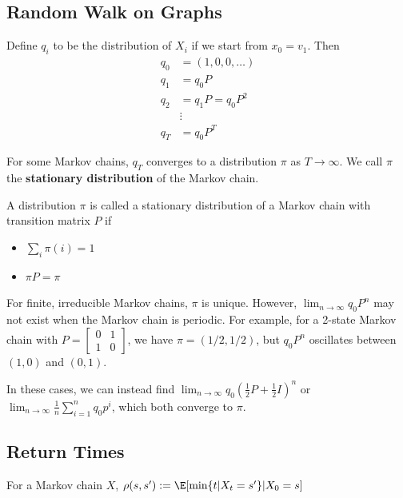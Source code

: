 \subsection{Random Walk on Graphs}

Define $q_i$ to be the distribution of $X_i$ if we start from $x_0=v_1$. Then
\begin{align*}
	q_0 & = (1,0,0,\ldots)  \\
	q_1 & = q_0 P           \\
	q_2 & = q_1 P = q_0 P^2 \\
	    & \vdots            \\
	q_T & = q_0 P^T
\end{align*}

For some Markov chains, $q_T$ converges to a distribution $\pi$ as $T \to \infty$. We call $\pi$ the \textbf{stationary distribution} of the Markov chain.

\begin{definition}
	A distribution $\pi$ is called a stationary distribution of a Markov chain with transition matrix $P$ if
	\begin{itemize}
		\item $\sum_i \pi(i)= 1$
		\item $\pi P = \pi$
	\end{itemize}
\end{definition}

For finite, irreducible Markov chains, $\pi$ is unique. However, $\lim_{n \to \infty} q_0 P^n$ may not exist when the Markov chain is periodic. For example, for a 2-state Markov chain with $P = \begin{bmatrix} 0 & 1 \\ 1 & 0 \end{bmatrix}$, we have $\pi = (1/2, 1/2)$, but $q_0 P^n$ oscillates between $(1,0)$ and $(0,1)$.

In these cases, we can instead find $\lim_{n \to \infty} q_0 (\frac{1}{2}P+\frac{1}{2}I)^n$ or $\lim_{n \to \infty} \frac{1}{n} \sum_{i=1}^{n}q_0p^i$, which both converge to $\pi$.

\subsection{Return Times}

\begin{definition}
	For a Markov chain $X$, $\rho(s,s'):=\E[\min\{t | X_t = s'\} | X_0 = s]$
\end{definition}

